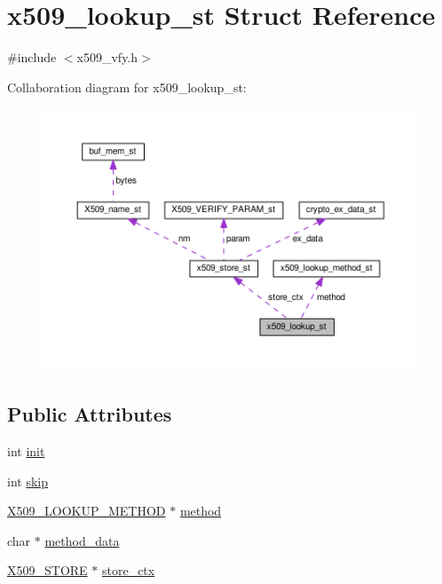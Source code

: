 \hypertarget{structx509__lookup__st}{}\section{x509\+\_\+lookup\+\_\+st Struct Reference}
\label{structx509__lookup__st}


{\ttfamily \#include $<$x509\+\_\+vfy.\+h$>$}



Collaboration diagram for x509\+\_\+lookup\+\_\+st\+:
\nopagebreak
\begin{figure}[H]
\begin{center}
\leavevmode
\includegraphics[width=350pt]{structx509__lookup__st__coll__graph}
\end{center}
\end{figure}
\subsection*{Public Attributes}
\begin{DoxyCompactItemize}
\item 
int \hyperlink{structx509__lookup__st_a63b25b8fcf160eac9348b88e48eab9c1}{init}
\item 
int \hyperlink{structx509__lookup__st_a8d1184cdc9e7f7c4d081a32df8b78a97}{skip}
\item 
\hyperlink{x509__vfy_8h_a795687b9a64050138f299d19013fe29d}{X509\+\_\+\+L\+O\+O\+K\+U\+P\+\_\+\+M\+E\+T\+H\+OD} $\ast$ \hyperlink{structx509__lookup__st_a84bf6103b3374899e01401931ee30eda}{method}
\item 
char $\ast$ \hyperlink{structx509__lookup__st_a63bfeed761e0dd16a8fe59d6a3933cb4}{method\+\_\+data}
\item 
\hyperlink{ossl__typ_8h_a3a2b800bae08729d11bc28f12b795597}{X509\+\_\+\+S\+T\+O\+RE} $\ast$ \hyperlink{structx509__lookup__st_a91fff2cdf32522eb0b037bdb9cdf2e53}{store\+\_\+ctx}
\end{DoxyCompactItemize}


